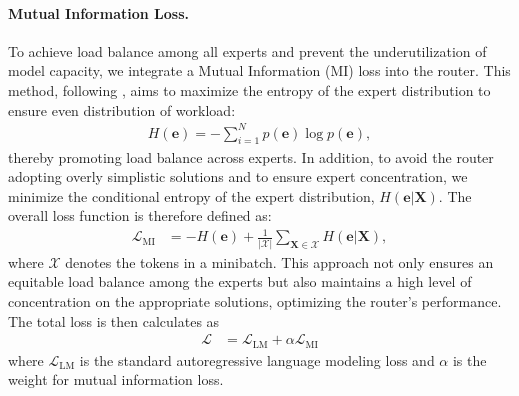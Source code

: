 \paragraph{Mutual Information Loss.} 
To achieve load balance among all experts and prevent the underutilization of model capacity, we integrate a Mutual Information (MI) loss into the router. This method, following \cite{shen2023moduleformer}, aims to maximize the entropy of the expert distribution to ensure even distribution of workload:
\begin{align}
    H(\mathbf{e}) = - \sum_{i=1}^{N}p(\mathbf{e})\log p(\mathbf{e}),
\end{align}
thereby promoting load balance across experts. In addition, to avoid the router adopting overly simplistic solutions and to ensure expert concentration, we minimize the conditional entropy of the expert distribution, \( H(\mathbf{e}|\mathbf{X}) \). The overall loss function is therefore defined as:
\begin{align}
    \mathcal{L}_{\mathrm{MI}} & = -  H(\mathbf{e}) + \frac{1}{|\mathcal{X}|} \sum_{\mathbf{X}\in \mathcal{X}} H(\mathbf{e}|\mathbf{X}),
\end{align}
where \( \mathcal{X} \) denotes the tokens in a minibatch. This approach not only ensures an equitable load balance among the experts but also maintains a high level of concentration on the appropriate solutions, optimizing the router's performance. The total loss is then calculates as
\begin{align}
    \mathcal{L} & = \mathcal{L}_{\mathrm{LM}} + \alpha \mathcal{L}_{\mathrm{MI}}
    \label{eq:total-loss}
\end{align}
where $\mathcal{L}_{\mathrm{LM}}$ is the standard autoregressive language modeling loss and $\alpha$ is the weight for mutual information loss.

